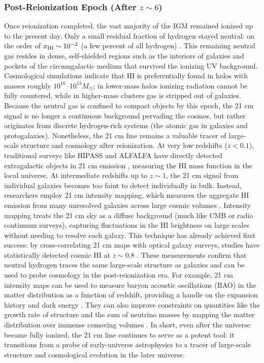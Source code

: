 \documentclass[floats,floatfix,showpacs,amssymb,prd,superscriptaddress,nofootinbib]{revtex4-2} %
\begin{document}
\subsubsection{Post-Reionization Epoch (After $z \sim 6$)}
Once reionization completed, the vast majority of the IGM remained ionized up to the present day. Only a small residual fraction of hydrogen stayed neutral: on the order of $x_{\rm HI} \sim 10^{-2}$ (a few percent of all hydrogen) \citep{Villaescusa-Navarro_2018}. This remaining neutral gas resides in dense, self-shielded regions such as the interiors of galaxies and pockets of the circumgalactic medium that survived the ionizing UV background. Cosmological simulations indicate that HI is preferentially found in halos with masses roughly $10^{10}$–$10^{13} M_\odot$; in lower-mass halos ionizing radiation cannot be fully countered, while in higher-mass clusters gas is stripped out of galaxies. Because the neutral gas is confined to compact objects by this epoch, the 21 cm signal is no longer a continuous background pervading the cosmos, but rather originates from discrete hydrogen-rich systems (the atomic gas in galaxies and protogalaxies). Nonetheless, the 21 cm line remains a valuable tracer of large-scale structure and cosmology after reionization. At very low redshifts ($z<0.1$), traditional surveys like HIPASS and ALFALFA have directly detected extragalactic objects in 21 cm emission 
, measuring the HI mass function in the local universe. At intermediate redshifts up to $z\sim1$, the 21 cm signal from individual galaxies becomes too faint to detect individually in bulk. Instead, researchers employ 21 cm intensity mapping, which measures the aggregate HI emission from many unresolved galaxies across large cosmic volumes
. Intensity mapping treats the 21 cm sky as a diffuse background (much like CMB or radio continuum surveys), capturing fluctuations in the HI brightness on large scales without needing to resolve each galaxy. This technique has already achieved first success: by cross-correlating 21 cm maps with optical galaxy surveys, studies have statistically detected cosmic HI at $z\sim0.8$ 
. These measurements confirm that neutral hydrogen traces the same large-scale structure as galaxies and can be used to probe cosmology in the post-reionization era. For example, 21 cm intensity maps can be used to measure baryon acoustic oscillations (BAO) in the matter distribution as a function of redshift, providing a handle on the expansion history and dark energy 
. They can also improve constraints on quantities like the growth rate of structure and the sum of neutrino masses by mapping the matter distribution over immense comoving volumes %
. In short, even after the universe became fully ionized, the 21 cm line continues to serve as a potent tool: it transitions from a probe of early-universe astrophysics to a tracer of large-scale structure and cosmological evolution in the later universe.
\end{document}
